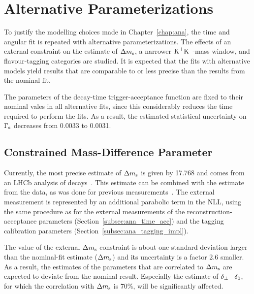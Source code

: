 \section{Alternative Parameterizations}
\label{sec:result_altParam}

To justify the modelling choices made in Chapter~\ref{chap:ana}, the time and angular fit is repeated with alternative parameterizations.
The effects of an external constraint on the estimate of $\Delta m_\text{s}$, a narrower $\text{K}^\text{+}\text{K}^\text{--}$-mass window, and flavour-tagging categories are studied.
It is expected that the fits with alternative models yield results that are comparable to or less precise than the results from the nominal
fit.

The parameters of the decay-time trigger-acceptance function are fixed to their nominal vales in all alternative fits, since this
considerably reduces the time required to perform the fits. As a result, the estimated statistical uncertainty on $\Gamma_\text{s}$ decreases from
0.0033\unitsp\invps{} to 0.0031\unitsp\invps.


\subsection{Constrained Mass-Difference Parameter}
\label{subsec:result_altParam_Delm}

Currently, the most precise estimate of $\Delta m_\text{s}$ is given by 17.768\unitsp\invps{} and comes from an LHCb analysis of
\BstoDsmpip{} decays~\cite{LHCb-PAPER-2013-006}. This estimate can be combined with the estimate from the \BstoJpsiKK{} data, as
was done for previous measurements~\cite{LHCb-PAPER-2011-021,*LHCb-ANA-2011-036,LHCb-PAPER-2013-002,*LHCb-ANA-2012-067}.
The external measurement is represented by an additional parabolic term in the NLL, using the same procedure as for the external
measurements of the reconstruction-acceptance parameters (Section~\ref{subsec:ana_time_acc}) and the tagging calibration parameters
(Section~\ref{subsec:ana_tagging_impl}).

The value of the external $\Delta m_\text{s}$ constraint is about one standard deviation larger than the nominal-fit estimate
($\Delta m_\text{s}$\unitsp\invps) and its uncertainty is a factor 2.6 smaller. As a result, the estimates of the parameters
that are correlated to $\Delta m_\text{s}$ are expected to deviate from the nominal result. Especially the estimate of $\delta_{\perp}\,\text{--}\,\delta_{0}$, for which the
correlation with $\Delta m_\text{s}$ is 70\%, will be significantly affected.

